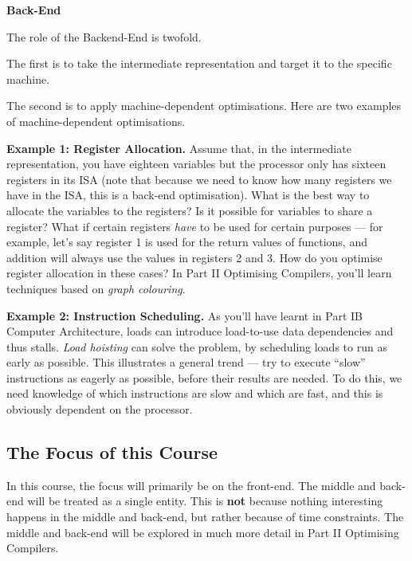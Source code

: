 \begin{minipage}[t]{0.15\textwidth}
\textbf{\sffamily Back-End}    
\end{minipage}%
\begin{minipage}[t]{0.85\textwidth}
    \setlength{\parskip}{.5\baselineskip}
    The role of the Backend-End is twofold. 

    The first is to take the intermediate representation and target it to the specific machine. 

    The second is to apply machine-dependent optimisations. Here are two examples of machine-dependent optimisations.
        
    \textbf{Example 1: Register Allocation.} Assume that, in the intermediate representation, you have eighteen variables but the processor only has sixteen registers in its ISA (note that because we need to know how many registers we have in the ISA, this is a back-end optimisation). What is the best way to allocate the variables to the registers? Is it possible for variables to share a register? What if certain registers \emph{have} to be used for certain purposes --- for example, let's say register 1 is used for the return values of functions, and addition will always use the values in registers 2 and 3. How do you optimise register allocation in these cases? In {\sffamily Part II Optimising Compilers}, you'll learn techniques based on \emph{graph colouring}.
    
    \textbf{Example 2: Instruction Scheduling.} As you'll have learnt in {\sffamily Part IB Computer Architecture}, loads can introduce load-to-use data dependencies and thus stalls. \textit{Load hoisting} can solve the problem, by scheduling loads to run as early as possible. This illustrates a general trend --- try to execute ``slow'' instructions as eagerly as possible, before their results are needed. To do this, we need knowledge of which instructions are slow and which are fast, and this is obviously dependent on the processor.
\end{minipage}

\subsection{The Focus of this Course}
In this course, the focus will primarily be on the front-end. The middle and back-end will be treated as a single entity. This is \textbf{not} because nothing interesting happens in the middle and back-end, but rather because of time constraints. The middle and back-end will be explored in much more detail in \textsf{Part II Optimising Compilers}.

